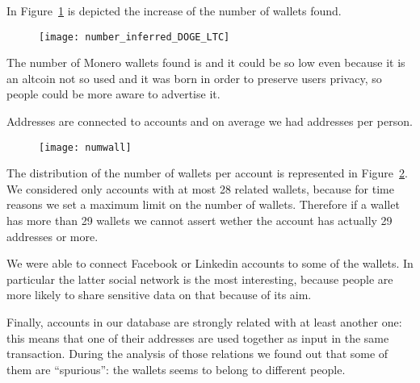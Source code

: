 In Figure~\ref{fig:dogeltcclustered} is depicted the increase of the number of
wallets found.
\begin{figure}
\centering
\texttt{[image: number\_inferred\_DOGE\_LTC]}
\label{fig:dogeltcclustered}
\end{figure}

The number of Monero wallets found is \startingXMR{} and it could
be so low even because it is an altcoin not so used and it was born in order
to preserve users privacy, so people could be more aware to advertise it.

Addresses are connected to \accountNumber{} accounts and on average we had
\avarageAccount{} addresses per person.
\begin{figure}
\centering
\texttt{[image: numwall]}
\label{fig:numwall}
\end{figure}
The distribution of the number of wallets per account is represented in
Figure~\ref{fig:numwall}. We considered only accounts with at most 28 related
wallets, because for time reasons we set a maximum limit on the number of
wallets. Therefore if a wallet has more than 29 wallets we cannot assert wether
the account has actually 29 addresses or more.

We were able to connect Facebook or Linkedin accounts to some of the wallets.
In particular the latter social network is the most interesting, because people
are more likely to share sensitive data on that because of its aim. 

Finally, \accountRelated{} accounts in our database are strongly related with
at least another one: this means that one of their addresses are used together
as input in the same transaction. During the analysis of those relations we
found out that some of them are ``spurious'': the wallets seems to belong to
different people.
